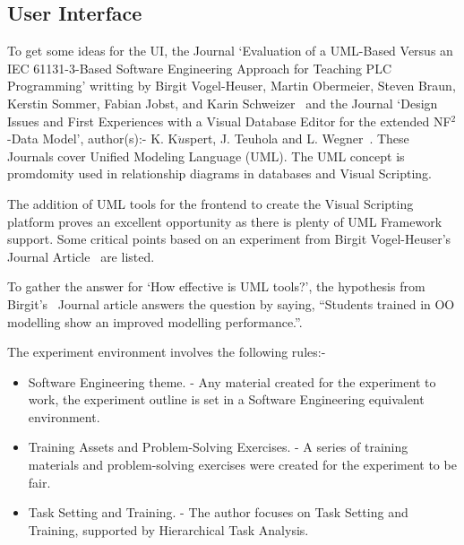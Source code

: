 \documentclass[12pt]{report} %
\begin{document}
		\subsection{User Interface}
		\label{subsec:userInterface}
			To get some ideas for the UI, the Journal `Evaluation of a UML-Based Versus an IEC 61131-3-Based Software Engineering Approach for Teaching PLC Programming' writting by Birgit Vogel-Heuser, Martin Obermeier, Steven Braun, Kerstin Sommer, Fabian Jobst, and Karin Schweizer~\cite{vogel-heuser_evaluation_2013} and the Journal `Design Issues and First Experiences with a Visual Database Editor for the extended NF$^{2}$-Data Model', author(s):- K. K${\ddot{u}}$spert, J. Teuhola and L. Wegner~\cite{kuspert_design_1990}. These Journals cover Unified Modeling Language (UML). The UML concept is promdomity used in relationship diagrams in databases and Visual Scripting. 

			The addition of UML tools for the frontend to create the Visual Scripting platform proves an excellent opportunity as there is plenty of UML Framework support. Some critical points based on an experiment from Birgit Vogel-Heuser's Journal Article~\cite{vogel-heuser_evaluation_2013} are listed.

			To gather the answer for `How effective is UML tools?', the hypothesis from Birgit's~\cite{vogel-heuser_evaluation_2013} Journal article answers the question by saying, ``Students trained in OO modelling show an improved modelling performance.''. 
		
			The experiment environment involves the following rules:-
			\begin{itemize}
			\item Software Engineering theme. - Any material created for the experiment to work, the experiment outline is set in a Software Engineering equivalent environment.
			\item Training Assets and Problem-Solving Exercises. - A series of training materials and problem-solving exercises were created for the experiment to be fair.
			\item Task Setting and Training. - The author focuses on Task Setting and Training, supported by Hierarchical Task Analysis.
			\end{itemize}
\end{document}
